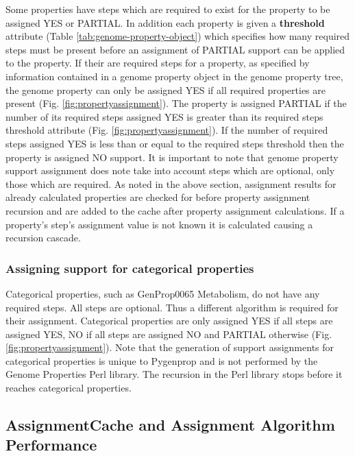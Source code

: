 Some properties have steps which are required to exist for the property to be assigned YES or PARTIAL. In addition each property is given a \textbf{threshold} attribute (Table \ref{tab:genome-property-object}) which specifies how many required steps must be present before an assignment of PARTIAL support can be applied to the property. If their are required steps for a property, as specified by information contained in a genome property object in the genome property tree, the genome property can only be assigned YES if all required properties are present (Fig. \ref{fig:propertyassignment}). The property is assigned PARTIAL if the number of its required steps assigned YES is greater than its required steps threshold attribute (Fig. \ref{fig:propertyassignment}). If the number of required steps assigned YES is less than or equal to the required steps threshold then the property is assigned NO support. It is important to note that genome property support assignment does note take into account steps which are optional, only those which are required. As noted in the above section, assignment results for already calculated properties are checked for before property assignment recursion and are added to the cache after property assignment calculations. If a property's step's assignment value is not known it is calculated causing a recursion cascade.

\subsubsection{Assigning support for categorical properties}

Categorical properties, such as GenProp0065 Metabolism, do not have any required steps. All steps are optional. Thus a different algorithm is required for their assignment. Categorical properties are only assigned YES if all steps are assigned YES, NO if all steps are assigned NO and PARTIAL otherwise (Fig. \ref{fig:propertyassignment}). Note that the generation of support assignments for categorical properties is unique to Pygenprop and is not performed by the Genome Properties Perl library. The recursion in the Perl library stops before it reaches categorical properties.

\subsection{AssignmentCache and Assignment Algorithm Performance}

